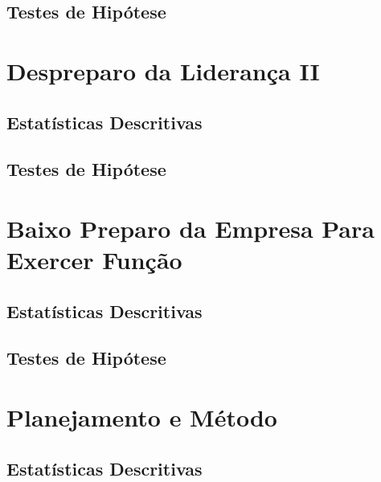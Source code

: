 \documentclass[]{book}
\begin{document}
\hypertarget{testes-de-hipotese-2}{%
\subsection{Testes de Hipótese}\label{testes-de-hipotese-2}}

\hypertarget{despreparo-da-lideranca-ii}{%
\section{Despreparo da Liderança II}\label{despreparo-da-lideranca-ii}}

\hypertarget{estatisticas-descritivas-3}{%
\subsection{Estatísticas Descritivas}\label{estatisticas-descritivas-3}}

\hypertarget{testes-de-hipotese-3}{%
\subsection{Testes de Hipótese}\label{testes-de-hipotese-3}}

\hypertarget{baixo-preparo-da-empresa-para-exercer-funcao-1}{%
\section{Baixo Preparo da Empresa Para Exercer Função}\label{baixo-preparo-da-empresa-para-exercer-funcao-1}}

\hypertarget{estatisticas-descritivas-4}{%
\subsection{Estatísticas Descritivas}\label{estatisticas-descritivas-4}}

\hypertarget{testes-de-hipotese-4}{%
\subsection{Testes de Hipótese}\label{testes-de-hipotese-4}}

\hypertarget{planejamento-e-metodo-1}{%
\section{Planejamento e Método}\label{planejamento-e-metodo-1}}

\hypertarget{estatisticas-descritivas-5}{%
\subsection{Estatísticas Descritivas}\label{estatisticas-descritivas-5}}
\end{document}
